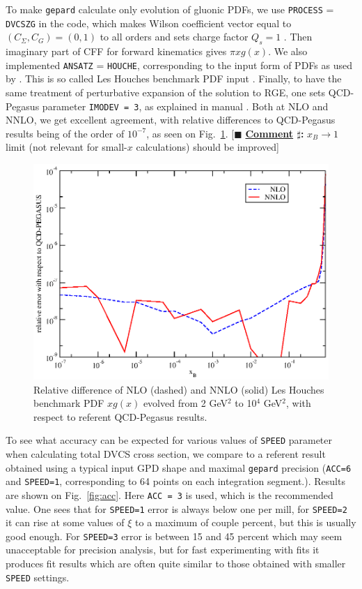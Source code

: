 \documentclass[12pt]{article}
\newcounter{comment}
\newcommand{\comminline}[1]{{%
\refstepcounter{comment}%
\ttfamily\small[$\blacksquare$ \textbf{\underline{Comment}
$\sharp$\thecomment:} #1]}}
\begin{document}
To make \texttt{gepard} calculate only evolution of gluonic PDFs, we use
\texttt{PROCESS} = \texttt{DVCSZG} in the code, which 
makes Wilson coefficient vector equal to $(C_{\Sigma}, C_G) = (0, 1)$
to all orders and sets charge factor $Q_s=1$ . Then imaginary part of CFF for forward 
kinematics gives $ \pi x g(x)$.
 We also implemented \texttt{ANSATZ} = \texttt{HOUCHE}, corresponding to the
input form of PDFs as used by \cite{Vogt:2004ns}. This is so called Les Houches benchmark PDF
input \cite{Giele:2002hx}.  Finally, to have the same treatment of perturbative expansion of
the solution to RGE, one sets {\sc QCD-Pegasus} parameter \texttt{IMODEV = 3}, as explained in
manual \cite{Vogt:2004ns}. 
Both at NLO and NNLO, we get excellent agreement, with relative differences to
{\sc QCD-Pegasus} results being of the order of $10^{-7}$, as seen on
Fig.~\ref{fig:PDFevol}. \comminline{$x_B \to 1$ limit (not relevant
for small-$x$ calculations) should be improved}


\begin{figure}
\begin{center}
\includegraphics[scale=0.8]{PDFevol}
\end{center}
\caption{Relative difference of NLO (dashed) and NNLO (solid) Les Houches benchmark PDF $x g(x)$
evolved from 2 GeV$^2$ to 10$^4$ GeV$^2$, with respect to referent {\sc QCD-Pegasus} 
\cite{Vogt:2004ns} results.}
\label{fig:PDFevol}
\end{figure}

To see what accuracy can be expected for various values of \texttt{SPEED} parameter 
when calculating total
DVCS cross section, we compare to a referent result obtained using a typical input GPD shape and
maximal \texttt{gepard} precision (\texttt{ACC=6} and \texttt{SPEED=1}, corresponding to
64 points on each integration segment.). Results are shown on
Fig.~\ref{fig:acc}. Here \texttt{ACC = 3} is used, which is the recommended value.
One sees that for  \texttt{SPEED=1} error is always below one per mill, for
\texttt{SPEED=2} it can rise at some values of $\xi$ to a maximum of couple percent, 
but this is usually good
enough. For \texttt{SPEED=3} error is between 15 and 45 percent which may seem
unacceptable for precision analysis, but for fast experimenting with fits it
produces fit results which are often quite similar to those obtained with
smaller \texttt{SPEED} settings.
\end{document}
